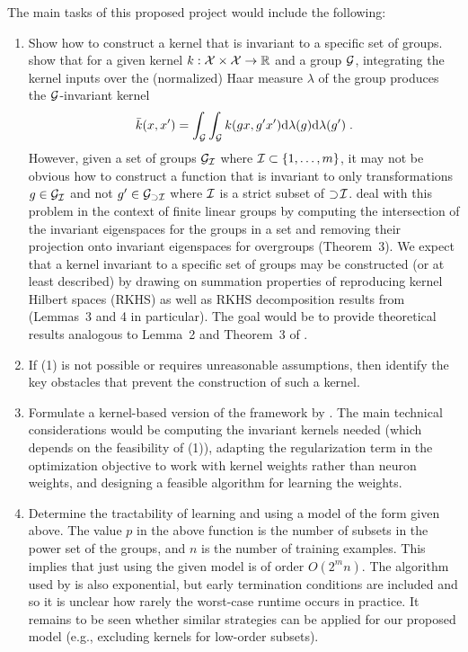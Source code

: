 The main tasks of this proposed project would include the following:
\begin{enumerate}

\item
Show how to construct a kernel that is invariant to a specific set of groups. \textcite{Haasdonk:2005} show that for a given kernel $k:\mathcal{X}\times\mathcal{X}\rightarrow\mathbb{R}$ and a group $\mathcal{G}$, integrating the kernel inputs over the (normalized) Haar measure $\lambda$ of the group produces the $\mathcal{G}$-invariant kernel
\[
\bar{k}(x,x') = \int_{\mathcal{G}} \int_{\mathcal{G}} k(gx,g'x')\mathrm{d}\lambda(g)\mathrm{d}\lambda(g')\;.
\]
However, given a set of groups $\mathcal{G}_{\mathcal{I}}$ where $\mathcal{I}\subset\{1,\ldots,m\}$, it may not be obvious how to construct a function that is invariant to only transformations $g\in\mathcal{G}_{\mathcal{I}}$ and not $g'\in\mathcal{G}_{\supset\mathcal{I}}$ where $\mathcal{I}$ is a strict subset of $\supset\!\mathcal{I}$. \textcite{Mouli:2021} deal with this problem in the context of finite linear groups by computing the intersection of the invariant eigenspaces for the groups in a set and removing their projection onto invariant eigenspaces for overgroups (Theorem~3). We expect that a kernel invariant to a specific set of groups may be constructed (or at least described) by drawing on summation properties of reproducing kernel Hilbert spaces (RKHS) as well as RKHS decomposition results from \parencite{Elesedy:2021} (Lemmas~3 and 4 in particular). The goal would be to provide theoretical results analogous to Lemma~2 and Theorem~3 of \parencite{Mouli:2021}.

\item
If (1) is not possible or requires unreasonable assumptions, then identify the key obstacles that prevent the construction of such a kernel.

\item
Formulate a kernel-based version of the framework by \citeauthor{Mouli:2021}. The main technical considerations would be computing the invariant kernels needed (which depends on the feasibility of (1)), adapting the regularization term in the optimization objective to work with kernel weights rather than neuron weights, and designing a feasible algorithm for learning the weights.

\item
Determine the tractability of learning and using a model of the form given above. The value $p$ in the above function is the number of subsets in the power set of the groups, and $n$ is the number of training examples. This implies that just using the given model is of order $O(2^mn)$. The algorithm used by \textcite{Mouli:2021} is also exponential, but early termination conditions are included and so it is unclear how rarely the worst-case runtime occurs in practice. It remains to be seen whether similar strategies can be applied for our proposed model (e.g., excluding kernels for low-order subsets).

\end{enumerate}

